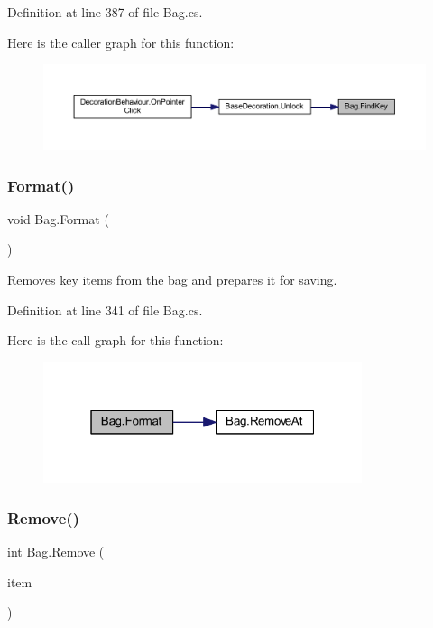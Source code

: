 Definition at line 387 of file Bag.\+cs.

Here is the caller graph for this function\+:
\nopagebreak
\begin{figure}[H]
\begin{center}
\leavevmode
\includegraphics[width=350pt]{class_bag_ab913ca67bac7d4a740a470dbb1632311_icgraph}
\end{center}
\end{figure}
\mbox{\label{class_bag_a3ee41396e25179a9c975c6f90d601bdd}} 
\subsubsection{\texorpdfstring{Format()}{Format()}}
{\footnotesize\ttfamily void Bag.\+Format (\begin{DoxyParamCaption}{ }\end{DoxyParamCaption})}



Removes key items from the bag and prepares it for saving. 



Definition at line 341 of file Bag.\+cs.

Here is the call graph for this function\+:
\nopagebreak
\begin{figure}[H]
\begin{center}
\leavevmode
\includegraphics[width=265pt]{class_bag_a3ee41396e25179a9c975c6f90d601bdd_cgraph}
\end{center}
\end{figure}
\mbox{\label{class_bag_a42a4319aa14d0b6bda7f91070ba57a47}} 
\subsubsection{\texorpdfstring{Remove()}{Remove()}}
{\footnotesize\ttfamily int Bag.\+Remove (\begin{DoxyParamCaption}\item[{\mbox{\hyperlink{class_base_item}{Base\+Item}}}]{item }\end{DoxyParamCaption})}



